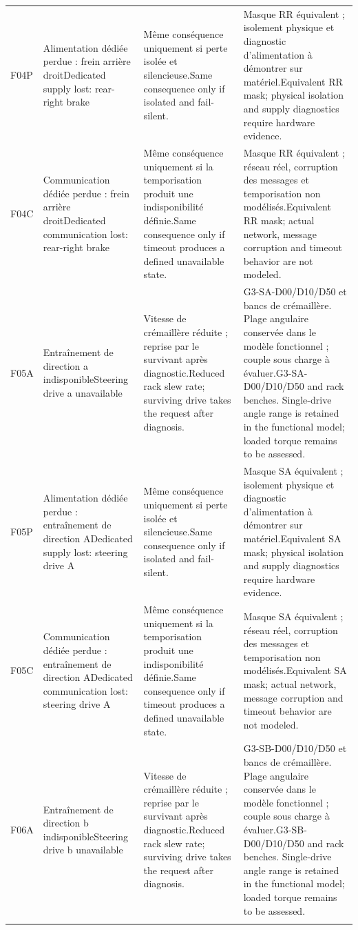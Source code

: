 \documentclass[11pt,a4paper,oneside]{report}
\newcommand{\bi}[2]{\iffrench #2\else #1\fi}
\begin{document}
\begin{longtable}{@{}p{12mm}>{\raggedright\arraybackslash}p{33mm}>{\raggedright\arraybackslash}p{42mm}>{\raggedright\arraybackslash}p{57mm}@{}}
F04P & \bi{Dedicated supply lost: rear-right brake}{Alimentation dédiée perdue : frein arrière droit} & \bi{Same consequence only if isolated and fail-silent.}{Même conséquence uniquement si perte isolée et silencieuse.} & \bi{Equivalent RR mask; physical isolation and supply diagnostics require hardware evidence.}{Masque RR équivalent ; isolement physique et diagnostic d'alimentation à démontrer sur matériel.}\\\addlinespace
F04C & \bi{Dedicated communication lost: rear-right brake}{Communication dédiée perdue : frein arrière droit} & \bi{Same consequence only if timeout produces a defined unavailable state.}{Même conséquence uniquement si la temporisation produit une indisponibilité définie.} & \bi{Equivalent RR mask; actual network, message corruption and timeout behavior are not modeled.}{Masque RR équivalent ; réseau réel, corruption des messages et temporisation non modélisés.}\\\addlinespace
F05A & \bi{Steering drive a unavailable}{Entraînement de direction a indisponible} & \bi{Reduced rack slew rate; surviving drive takes the request after diagnosis.}{Vitesse de crémaillère réduite ; reprise par le survivant après diagnostic.} & \bi{G3-SA-D00/D10/D50 and rack benches. Single-drive angle range is retained in the functional model; loaded torque remains to be assessed.}{G3-SA-D00/D10/D50 et bancs de crémaillère. Plage angulaire conservée dans le modèle fonctionnel ; couple sous charge à évaluer.}\\\addlinespace
F05P & \bi{Dedicated supply lost: steering drive A}{Alimentation dédiée perdue : entraînement de direction A} & \bi{Same consequence only if isolated and fail-silent.}{Même conséquence uniquement si perte isolée et silencieuse.} & \bi{Equivalent SA mask; physical isolation and supply diagnostics require hardware evidence.}{Masque SA équivalent ; isolement physique et diagnostic d'alimentation à démontrer sur matériel.}\\\addlinespace
F05C & \bi{Dedicated communication lost: steering drive A}{Communication dédiée perdue : entraînement de direction A} & \bi{Same consequence only if timeout produces a defined unavailable state.}{Même conséquence uniquement si la temporisation produit une indisponibilité définie.} & \bi{Equivalent SA mask; actual network, message corruption and timeout behavior are not modeled.}{Masque SA équivalent ; réseau réel, corruption des messages et temporisation non modélisés.}\\\addlinespace
F06A & \bi{Steering drive b unavailable}{Entraînement de direction b indisponible} & \bi{Reduced rack slew rate; surviving drive takes the request after diagnosis.}{Vitesse de crémaillère réduite ; reprise par le survivant après diagnostic.} & \bi{G3-SB-D00/D10/D50 and rack benches. Single-drive angle range is retained in the functional model; loaded torque remains to be assessed.}{G3-SB-D00/D10/D50 et bancs de crémaillère. Plage angulaire conservée dans le modèle fonctionnel ; couple sous charge à évaluer.}\\\addlinespace

\end{longtable}
\end{document}
